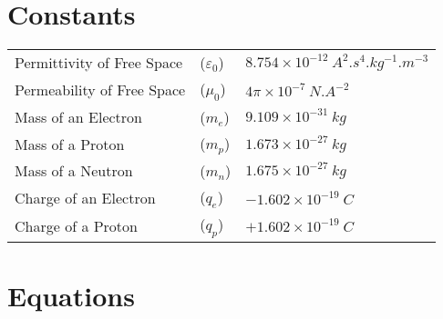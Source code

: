 \documentclass[main.tex]{subfiles}
\begin{document}
        \section{Constants}
            \label{sec: Constants - Electromagnetism}
            \begin{table}[!h]
                \noindent\begin{tabular}{@{} p{50mm} C{10mm} p{50mm}}
                    Permittivity of Free Space &($\varepsilon_0$) &$8.754\times 10^{-12}\ \si{A^2 . s^4 .kg^{-1} .m^{-3}}$\\[\tablegap]
                    Permeability of Free Space &($\mu_0$) &$4\pi\times 10^{-7}\ \si{N. A^{-2}}$\\[3\tablegap]
                    Mass of an Electron &($m_e$) &$9.109\times 10^{-31}\ \si{kg}$\\[\tablegap]
                    Mass of a Proton &($m_p$) &$1.673\times 10^{-27}\ \si{kg}$\\[\tablegap]
                    Mass of a Neutron &($m_n$) &$1.675\times 10^{-27}\ \si{kg}$\\[3\tablegap]
                    Charge of an Electron &($q_e$) &$-1.602\times 10^{-19}\ \si{C}$\\[\tablegap]
                    Charge of a Proton &($q_p$) &$+1.602\times 10^{-19}\ \si{C}$
                \end{tabular} 
            \end{table}
        
        \newpage
        \section{Equations}
            \label{sec: Equations Electromagnetism}
\end{document}
